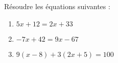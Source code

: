 \begin{minipage}{0.99\linewidth}

\exo

Résoudre les équations suivantes :

\begin{multicols}{3}

\begin{enumerate}

\item $ 5x+12 = 2x + 33$ 
\item $ -7x+42 = 9x - 67 $ 
\item $ 9(x-8)+3(2x+5) = 100 $ 


\end{enumerate}

\end{multicols}

\end{minipage}

\vspace{0.5cm}
